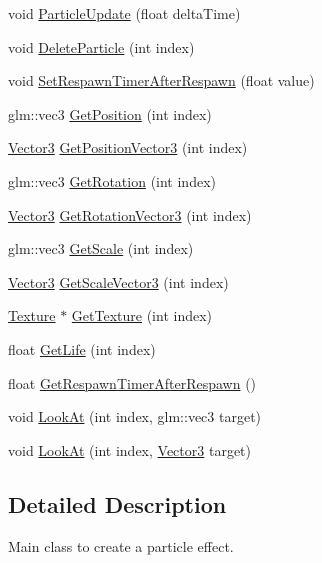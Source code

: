 \begin{DoxyCompactItemize}
\item 
void \mbox{\hyperlink{class_particle_effect_a416fd6e7ea5e69dbb5bd77f8a9487c82}{Particle\+Update}} (float delta\+Time)
\item 
void \mbox{\hyperlink{class_particle_effect_aa1023240c50786ef4f68a768b1bf02d4}{Delete\+Particle}} (int index)
\item 
void \mbox{\hyperlink{class_particle_effect_a61209f0862c570e840664fb4e4051b01}{Set\+Respawn\+Timer\+After\+Respawn}} (float value)
\item 
glm\+::vec3 \mbox{\hyperlink{class_particle_effect_a0bf5361cc63c5aa468159a05ca44e8d7}{Get\+Position}} (int index)
\item 
\mbox{\hyperlink{struct_vector3}{Vector3}} \mbox{\hyperlink{class_particle_effect_a08a4f5412f722d8f6234c5315128d6f3}{Get\+Position\+Vector3}} (int index)
\item 
glm\+::vec3 \mbox{\hyperlink{class_particle_effect_a2a20f8db2c022ed139eb236bd10b470d}{Get\+Rotation}} (int index)
\item 
\mbox{\hyperlink{struct_vector3}{Vector3}} \mbox{\hyperlink{class_particle_effect_a48bdcec118c008cdfdd6aaf543af81e6}{Get\+Rotation\+Vector3}} (int index)
\item 
glm\+::vec3 \mbox{\hyperlink{class_particle_effect_a7c6942ff4bad2193f97221b82d7a0b4a}{Get\+Scale}} (int index)
\item 
\mbox{\hyperlink{struct_vector3}{Vector3}} \mbox{\hyperlink{class_particle_effect_acbcc803070f0aa89ddbba4989c1c7e9d}{Get\+Scale\+Vector3}} (int index)
\item 
\mbox{\hyperlink{class_texture}{Texture}} $\ast$ \mbox{\hyperlink{class_particle_effect_a4479666080a2a5d8b92b0ea74d401895}{Get\+Texture}} (int index)
\item 
float \mbox{\hyperlink{class_particle_effect_ade096976cbd5c1437130d90199866d73}{Get\+Life}} (int index)
\item 
float \mbox{\hyperlink{class_particle_effect_ae62bebdcffc8d6154a919601dd60e880}{Get\+Respawn\+Timer\+After\+Respawn}} ()
\item 
void \mbox{\hyperlink{class_particle_effect_a24f05464826e67aa4f6aec7e518357ec}{Look\+At}} (int index, glm\+::vec3 target)
\item 
void \mbox{\hyperlink{class_particle_effect_a86079b5ebfbcc355f56a38f8ed7e5573}{Look\+At}} (int index, \mbox{\hyperlink{struct_vector3}{Vector3}} target)
\end{DoxyCompactItemize}


\subsection{Detailed Description}
Main class to create a particle effect. 

